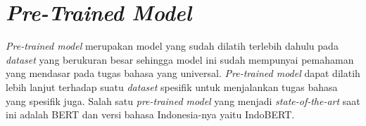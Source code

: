 \section{\textit{Pre-Trained Model}}

\textit{Pre-trained model} merupakan model yang sudah dilatih terlebih dahulu pada \textit{dataset} yang berukuran besar sehingga model ini sudah mempunyai pemahaman yang mendasar pada tugas bahasa yang universal. \textit{Pre-trained model} dapat dilatih lebih lanjut terhadap suatu \textit{dataset} spesifik untuk menjalankan tugas bahasa yang spesifik juga. Salah satu \textit{pre-trained model} yang menjadi \textit{state-of-the-art} saat ini adalah BERT dan versi bahasa Indonesia-nya yaitu IndoBERT. 